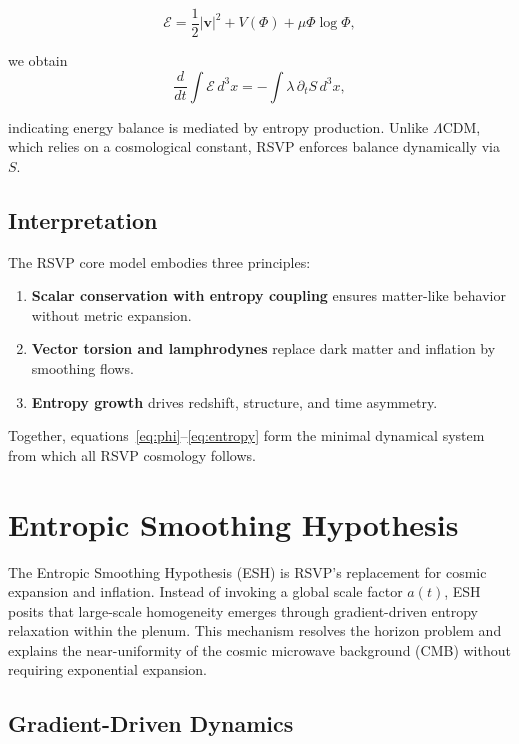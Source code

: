 \documentclass[12pt]{report}
\begin{document}
\begin{equation}
\mathcal{E} = \frac{1}{2}|\mathbf{v}|^2 + V(\Phi) + \mu \Phi \log \Phi,
\end{equation}

we obtain
\begin{equation}
\frac{d}{dt}\int \mathcal{E}\, d^3x = - \int \lambda \, \partial_t S \, d^3x,
\end{equation}

indicating energy balance is mediated by entropy production. Unlike $\Lambda$CDM, which relies on a cosmological constant, RSVP enforces balance dynamically via $S$.

\section{Interpretation}

The RSVP core model embodies three principles:

\begin{enumerate}
    \item \textbf{Scalar conservation with entropy coupling} ensures matter-like behavior without metric expansion.
    \item \textbf{Vector torsion and lamphrodynes} replace dark matter and inflation by smoothing flows.
    \item \textbf{Entropy growth} drives redshift, structure, and time asymmetry.
\end{enumerate}

Together, equations~\eqref{eq:phi}--\eqref{eq:entropy} form the minimal dynamical system from which all RSVP cosmology follows.


\chapter{Entropic Smoothing Hypothesis}

The Entropic Smoothing Hypothesis (ESH) is RSVP’s replacement for cosmic expansion and inflation. Instead of invoking a global scale factor $a(t)$, ESH posits that large-scale homogeneity emerges through gradient-driven entropy relaxation within the plenum. This mechanism resolves the horizon problem and explains the near-uniformity of the cosmic microwave background (CMB) without requiring exponential expansion.

\section{Gradient-Driven Dynamics}
\end{document}
